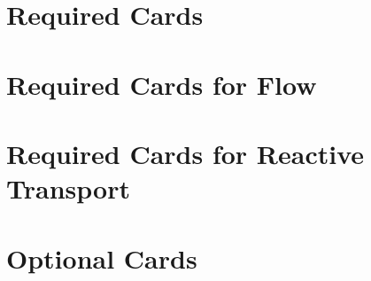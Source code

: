 \documentclass{beamer}
\begin{document}


\section{Required Cards}








\section{Required Cards for Flow}


\section{Required Cards for Reactive Transport}




\section{Optional Cards}



\end{document}
